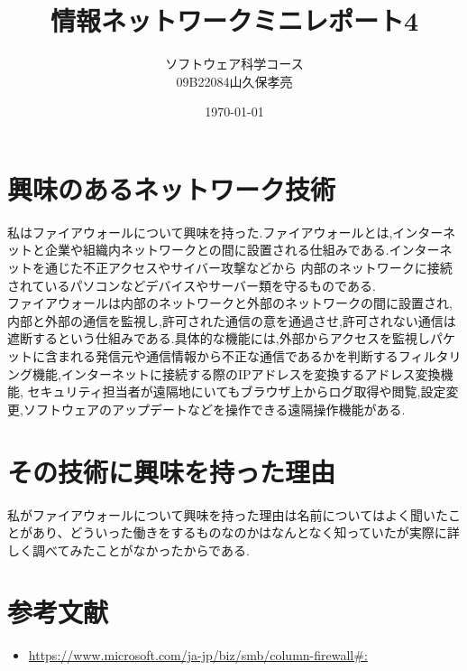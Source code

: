 \documentclass[dvipdfmx]{jarticle}
\title{情報ネットワークミニレポート4}
\author{ソフトウェア科学コース\\09B22084山久保孝亮}
\date{\today}
\begin{document}
\maketitle
\section{興味のあるネットワーク技術}
私はファイアウォールについて興味を持った.ファイアウォールとは,インターネットと企業や組織内ネットワークとの間に設置される仕組みである.インターネットを通じた不正アクセスやサイバー攻撃などから
内部のネットワークに接続されているパソコンなどデバイスやサーバー類を守るものである.\\
ファイアウォールは内部のネットワークと外部のネットワークの間に設置され,内部と外部の通信を監視し,許可された通信の意を通過させ,許可されない通信は遮断するという仕組みである.具体的な機能には,外部からアクセスを監視しパケットに含まれる発信元や通信情報から不正な通信であるかを判断するフィルタリング機能,インターネットに接続する際のIPアドレスを変換するアドレス変換機能,
セキュリティ担当者が遠隔地にいてもブラウザ上からログ取得や閲覧,設定変更,ソフトウェアのアップデートなどを操作できる遠隔操作機能がある.
\section{その技術に興味を持った理由}
私がファイアウォールについて興味を持った理由は名前についてはよく聞いたことがあり、どういった働きをするものなのかはなんとなく知っていたが実際に詳しく調べてみたことがなかったからである.
\section{参考文献}
\begin{itemize}
    \item \url{https://www.microsoft.com/ja-jp/biz/smb/column-firewall#:}
\end{itemize}
\end{document}
